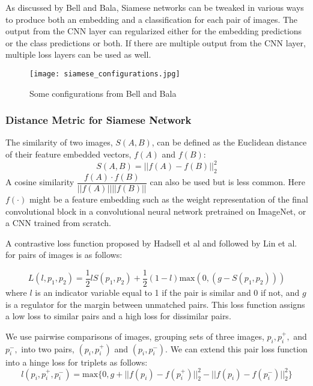 As discussed by Bell and Bala\cite{bell2015learning}, Siamese networks can be tweaked in various ways to produce both an embedding and a classification for each pair of images. The output from the CNN layer can regularized either for the embedding predictions or the class predictions or both. If there are multiple output from the CNN layer, multiple loss layers can be used as well.

\begin{figure}[!htbp]
	\label{fig:siamese_configurations}
	\centering
	\texttt{[image: siamese\_configurations.jpg]}
	\caption{Some configurations from Bell and Bala}
\end{figure}


\subsubsection{Distance Metric for Siamese Network}
The similarity of two images, $S(A,B)$, can be defined as the Euclidean distance of their feature embedded vectors, $f(A)$ and $f(B)$:
\begin{equation}
S(A,B) = ||f(A) - f(B)||_2^2
\end{equation}
A cosine similarity $\dfrac{f(A) \cdot f(B)}{||f(A)||||f(B)||}$ can also be used but is less common. Here $f(\cdot)$ might be a feature embedding such as the weight representation of the final convolutional block in a convolutional neural network pretrained on ImageNet, or a CNN trained from scratch.

A contrastive loss function proposed by Hadsell et al and followed by Lin et al. for pairs of images is as follows:

\begin{equation}
L(l, p_1, p_2) = \dfrac{1}{2}lS(p_1, p_2) + \dfrac{1}{2}(1-l)\text{max}(0, (g-S(p_1,p_2)))
\end{equation}
where $l$ is an indicator variable equal to 1 if the pair is similar and 0 if not, and $g$ is a regulator for the margin between unmatched pairs.\cite{hadsell2006dimensionality}\cite{lin2015learning} This loss function assigns a low loss to similar pairs and a high loss for dissimilar pairs. 

We use pairwise comparisons of images, grouping sets of three images, $p_i, p_i^+,$ and $p_i^-,$ into two pairs, $(p_i, p_i^+)$ and $(p_i, p_i^-)$. We can extend this pair loss function into a hinge loss for triplets as follows\cite{wang2014learning}:
\begin{equation}
l(p_i, p_i^+, p_i^-) = \text{max}\{0, g + ||f(p_i) - f(p_i^+)||_2^2 - ||f(p_i)-f(p_i^-)||_2^2\}
\end{equation}

